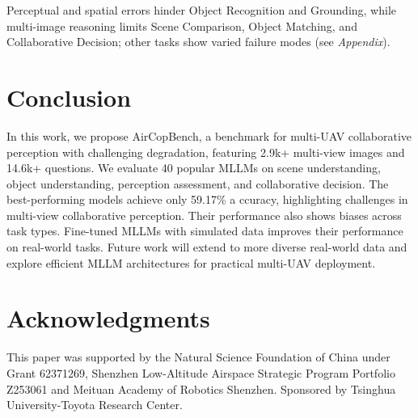 \documentclass[letterpaper]{article} %
\begin{document}
Perceptual and spatial errors hinder Object Recognition and Grounding, while multi-image reasoning limits Scene Comparison, Object Matching, and Collaborative Decision; other tasks show varied failure modes (see \textit{Appendix}).


\section{Conclusion}

In this work, we propose AirCopBench, a benchmark for multi-UAV collaborative perception with challenging degradation, featuring 2.9k+ multi-view images and 14.6k+ questions. We evaluate 40 popular MLLMs on scene understanding, object understanding, perception assessment, and collaborative decision. The best-performing models achieve only 59.17\% a ccuracy, highlighting challenges in multi-view collaborative perception. Their performance also shows biases across task types. Fine-tuned MLLMs with simulated data improves their performance on real-world tasks. Future work will extend to more diverse real-world data and explore efficient MLLM architectures for practical multi-UAV deployment.

\section{Acknowledgments}
This paper was supported by the Natural Science Foundation of China under Grant 62371269, Shenzhen Low-Altitude Airspace Strategic Program Portfolio Z253061 and Meituan Academy of Robotics Shenzhen. Sponsored by Tsinghua University-Toyota Research Center.



\end{document}
